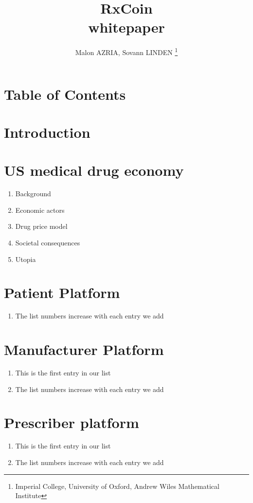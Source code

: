\documentclass[a4paper,11pt]{article}
\title{RxCoin\\\Large{whitepaper}\\}
\author{Malon AZRIA, Sovann LINDEN \thanks{Imperial College, University of Oxford, Andrew Wiles Mathematical Institute}}
\begin{document}
   \maketitle


\section{Table of Contents}
   
   
\section{Introduction}
   

\section{US medical drug economy }
   \begin{enumerate}
   \item Background
   \item Economic actors
   \item Drug price model
   \item Societal consequences
   \item Utopia
   
\end{enumerate}
   
\section{Patient Platform}
   \begin{enumerate}
   \item The list numbers increase with each entry we add
\end{enumerate}
   
\section{Manufacturer Platform}
   \begin{enumerate}
   \item This is the first entry in our list
   \item The list numbers increase with each entry we add
\end{enumerate}
   
   
\section{Prescriber platform}
   \begin{enumerate}
   \item This is the first entry in our list
   \item The list numbers increase with each entry we add
\end{enumerate}
   
\end{document}
